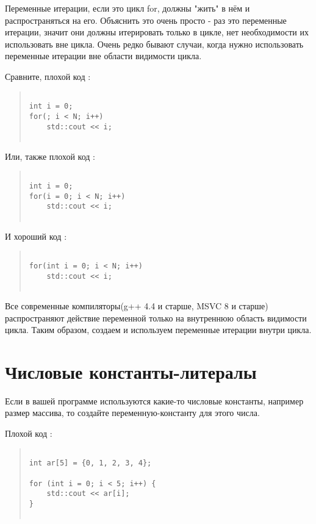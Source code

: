 Переменные итерации, если это цикл for, должны "жить" в нём и распространяться на его. Объяснить это очень просто - раз это переменные итерации, значит они должны итерировать только в цикле, нет необходимости их использовать вне цикла. Очень редко бывают случаи, когда нужно использовать переменные итерации вне области видимости цикла. 

Сравните, плохой код :
\begin{quote}
\begin{verbatim}
 
int i = 0;
for(; i < N; i++)
    std::cout << i;
 
\end{verbatim}
\end{quote}
Или, также плохой код :
\begin{quote}
\begin{verbatim}
 
int i = 0;
for(i = 0; i < N; i++)
    std::cout << i;
 
\end{verbatim}
\end{quote}

И хороший код :
\begin{quote}
\begin{verbatim}
 
for(int i = 0; i < N; i++)
    std::cout << i;
 
\end{verbatim}
\end{quote}
Все современные компиляторы(g++ 4.4 и старше, MSVC 8 и старше) распространяют действие переменной только на внутреннюю область видимости цикла. 
Таким образом, создаем и используем переменные итерации внутри цикла.

\section{  Числовые константы-литералы }

Если в вашей программе используются какие-то числовые константы, например размер массива, то создайте переменную-константу для этого числа.

Плохой код :
\begin{quote}
\begin{verbatim}
 
int ar[5] = {0, 1, 2, 3, 4};

for (int i = 0; i < 5; i++) {
    std::cout << ar[i];
}
 
\end{verbatim}
\end{quote}

